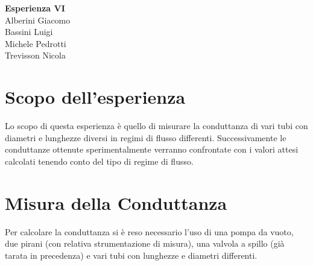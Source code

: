 \documentclass[a4paper,11pt]{article}
\begin{document}
\begin{center}
\textbf{\huge Esperienza VI} \\ \vspace{10pt}
\large Alberini Giacomo \\ Bassini Luigi \\ Michele Pedrotti\\ Trevisson Nicola 
\end{center}
\section{Scopo dell'esperienza}
Lo scopo di questa esperienza è quello di misurare la conduttanza di vari tubi con diametri e lunghezze diversi in regimi di flusso differenti. Successivamente le conduttanze ottenute sperimentalmente verranno confrontate con i valori attesi calcolati tenendo conto del tipo di regime di flusso. 
\section{Misura della Conduttanza}

Per calcolare la conduttanza si è reso necessario l'uso di una pompa da vuoto, due pirani (con relativa strumentazione di misura), una valvola a spillo (già tarata in precedenza) e vari tubi con lunghezze e diametri differenti.
\end{document}
